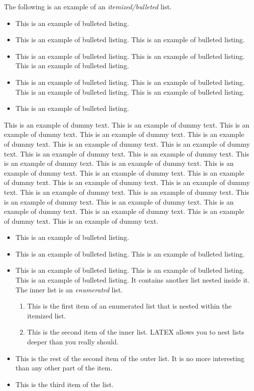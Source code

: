 \documentclass{jpp}
\begin{document}
The following is an example of an \textit{itemized/bulleted} list.

\begin{itemize}
\item This is an example of bulleted listing.
\item This is an example of bulleted listing. This is an example of bulleted listing.
\item This is an example of bulleted listing. This is an example of bulleted listing. This is an
example of bulleted listing.
\item This is an example of bulleted listing. This is an example of bulleted listing. This is an
example of bulleted listing. This is an example of bulleted listing.
\item This is an example of bulleted listing.
\end{itemize}

This is an example of dummy text. This is an example of dummy text. This is an example
of dummy text. This is an example of dummy text. This is an example of dummy text. This is
an example of dummy text. This is an example of dummy text. This is an example of dummy
text. This is an example of dummy text. This is an example of dummy text. This is an example
of dummy text. This is an example of dummy text. This is an example of dummy text. This is
an example of dummy text. This is an example of dummy text. This is an example of dummy
text. This is an example of dummy text. This is an example of dummy text. This is an example
of dummy text. This is an example of dummy text. This is an example of dummy text. This is
an example of dummy text. This is an example of dummy text. This is an example of dummy
text.

\begin{itemize}
\item This is an example of bulleted listing.
\item This is an example of bulleted listing. This is an example of bulleted listing.
\item This is an example of bulleted listing. This is an example of bulleted listing. This is an
example of bulleted listing. It contains another list nested inside it. The inner list is an
\textit{enumerated} list.

\begin{enumerate}
\item[1.] This is the first item of an enumerated list that is nested within the itemized list.
\item[2.] This is the second item of the inner list. LATEX allows you to nest lists deeper than
you really should.
\end{enumerate}
\item[]This is the rest of the second item of the outer list. It is no more interesting than any other
part of the item.
\item This is the third item of the list.
\end{itemize}
\end{document}
